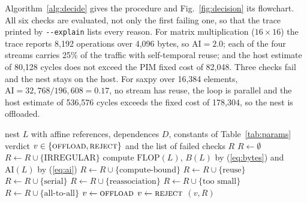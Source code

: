 \documentclass{ieeeaccess}
\begin{document}
Algorithm~\ref{alg:decide} gives the procedure and Fig.~\ref{fig:decision} its flowchart. All six checks are evaluated, not only the first failing one, so that the trace printed by \texttt{-{}-explain} lists every reason. For matrix multiplication ($16\times16$) the trace reports 8,192 operations over 4,096 bytes, so $\mathrm{AI}=2.0$; each of the four streams carries 25\% of the traffic with self-temporal reuse; and the host estimate of 80,128 cycles does not exceed the PIM fixed cost of 82,048. Three checks fail and the nest stays on the host. For saxpy over 16,384 elements, $\mathrm{AI}=32{,}768/196{,}608=0.17$, no stream has reuse, the loop is parallel and the host estimate of 536,576 cycles exceeds the fixed cost of 178,304, so the nest is offloaded.

\begin{algorithm}[!t]
\caption{Six-check offload decision for one loop nest}
\label{alg:decide}
\begin{algorithmic}[1]
\REQUIRE nest $L$ with affine references, dependences $D$, constants of Table~\ref{tab:params}
\ENSURE verdict $v\in\{\textsc{offload},\textsc{reject}\}$ and the list of failed checks $R$
\STATE $R \leftarrow \emptyset$
  \STATE $R \leftarrow R \cup \{\text{IRREGULAR}\}$
\ELSE
  \STATE compute $\mathrm{FLOP}(L)$, $B(L)$ by (\ref{eq:bytes}) and $\mathrm{AI}(L)$ by (\ref{eq:ai})
   \STATE $R \leftarrow R \cup \{\text{compute-bound}\}$ \ENDIF
   \STATE $R \leftarrow R \cup \{\text{reuse}\}$ \ENDIF
   \STATE $R \leftarrow R \cup \{\text{serial}\}$ \ENDIF
   \STATE $R \leftarrow R \cup \{\text{reassociation}\}$ \ENDIF
   \STATE $R \leftarrow R \cup \{\text{too small}\}$ \ENDIF
    \STATE $R \leftarrow R \cup \{\text{all-to-all}\}$
  \ENDIF
\ENDIF
{} \STATE $v \leftarrow \textsc{offload}$ \ELSE \STATE $v \leftarrow \textsc{reject}$ \ENDIF
\RETURN $(v, R)$
\end{algorithmic}
\end{algorithm}
\end{document}

